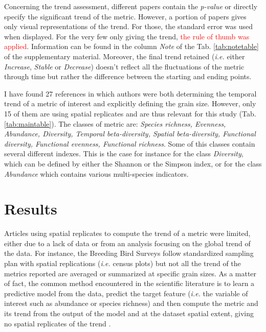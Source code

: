 \documentclass[
  12pt,
  oneside]{report}
\begin{document}
Concerning the trend assessment, different papers contain the \emph{p-value} or directly specify the significant trend of the metric. However, a portion of papers gives only visual representations of the trend. For those, the standard error was used when displayed. For the very few only giving the trend, \textcolor{red}{the rule of thumb was applied}. Information can be found in the column \emph{Note} of the Tab. \ref{tab:notetable} of the supplementary material. Moreover, the final trend retained (\emph{i.e.} either \emph{Increase}, \emph{Stable} or \emph{Decrease}) doesn't reflect all the fluctuations of the metric through time but rather the difference between the starting and ending points.

I have found 27 references in which authors were both determining the temporal trend of a metric of interest and explicitly defining the grain size. However, only 15 of them are using spatial replicates and are thus relevant for this study (Tab. \ref{tab:maintable}). The classes of metric are: \emph{Species richness, Evenness, Abundance, Diversity, Temporal beta-diversity, Spatial beta-diversity, Functional diversity, Functional evenness, Functional richness}. Some of this classes contain several different indexes. This is the case for instance for the class \emph{Diversity}, which can be defined by either the Shannon or the Simpson index, or for the class \emph{Abundance} which contains various multi-species indicators.

\hypertarget{results}{%
\chapter{Results}\label{results}}

Articles using spatial replicates to compute the trend of a metric were limited, either due to a lack of data or from an analysis focusing on the global trend of the data. For instance, the Breeding Bird Surveys \citep[\emph{e.g.}][]{sauer_north_2013, kamp_population_2021} follow standardized sampling plan with spatial replications (\emph{i.e.} census plots) but not all the trend of the metrics reported are averaged or summarized at specific grain sizes. As a matter of fact, the common method encountered in the scientific literature is to learn a predictive model from the data, predict the target feature (\emph{i.e.} the variable of interest such as abundance or species richness) and then compute the metric and its trend from the output of the model and at the dataset spatial extent, giving no spatial replicates of the trend \citep[\emph{e.g.}][]{jiguet_modeling_2005, jiguet_french_2012, eglington_disentangling_2012, doxa_low-intensity_2010, sauer_first_2017}.
\end{document}
